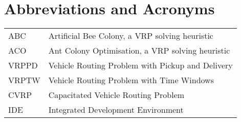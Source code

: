 \chapter*{Abbreviations and Acronyms}


\noindent
\begin{longtable}{@{}p{}p{}@{}}
ABC & Artificial Bee Colony, a VRP solving heuristic \\
ACO & Ant Colony Optimisation, a VRP solving heuristic \\
VRPPD & Vehicle Routing Problem with Pickup and Delivery \\
VRPTW & Vehicle Routing Problem with Time Windows \\ 
CVRP & Capacitated Vehicle Routing Problem \\ 
IDE & Integrated Development Environment

\end{longtable}
